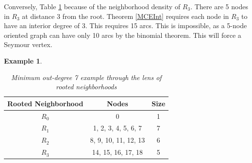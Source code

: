 \documentclass[AMS, Times1COL]{article} %
\theoremstyle{definition}
\newtheorem{example}{Example}[section]
\begin{document}
	Conversely, Table \ref{exdegdoub12} because of the neighborhood density of $R_3$. There are 5 nodes in $R_3$ at distance 3 from the root. Theorem \ref{MCEInt} requires each node in $R_3$ to have an interior degree of $3$. This requires 15 arcs. This is impossible, as a 5-node oriented graph can have only 10 arcs by the binomial theorem. This will force a Seymour vertex.
	
	\begin{example}
		\begin{table}[h!]
			\centering
			\begin{tabular}{|c|c|c|}
				\hline
				\textbf{Rooted Neighborhood} & \textbf{Nodes} & \textbf{Size} \\
				\hline
				$R_0$ & 0 & 1 \\
				$R_1$ & 1, 2, 3, 4, 5, 6, 7 & 7 \\
				$R_2$ & 8, 9, 10, 11, 12, 13 & 6 \\
				$R_3$ & 14, 15, 16, 17, 18 & 5 \\
				\hline
			\end{tabular}
			\caption{\textit{Minimum out-degree 7 example through the lens of rooted neighborhoods}} \label{exdegdoub12}
		\end{table}
	\end{example}
	
\end{document}
